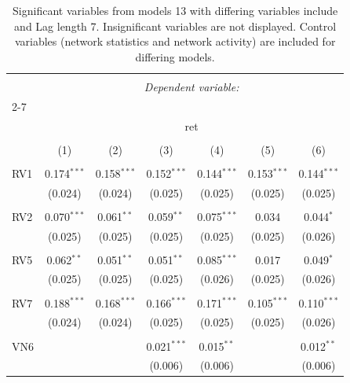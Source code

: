 
\begin{table}[!htbp] \centering 
  \caption{Significant variables from models 13 with differing variables include 
                               and Lag length 7. Insignificant variables are not displayed. 
                               Control variables (network statistics and network activity) are 
                               included for differing models.} 
  \label{RVmodels1_t} 
\scriptsize 
\begin{tabular}{@{\extracolsep{5pt}}lcccccc} 
\\[-1.8ex]\hline 
\hline \\[-1.8ex] 
 & \multicolumn{6}{c}{\textit{Dependent variable:}} \\ 
\cline{2-7} 
\\[-1.8ex] & \multicolumn{6}{c}{ret} \\ 
\\[-1.8ex] & (1) & (2) & (3) & (4) & (5) & (6)\\ 
\hline \\[-1.8ex] 
 RV1 & 0.174$^{***}$ & 0.158$^{***}$ & 0.152$^{***}$ & 0.144$^{***}$ & 0.153$^{***}$ & 0.144$^{***}$ \\ 
  & (0.024) & (0.024) & (0.025) & (0.025) & (0.025) & (0.025) \\ 
  & & & & & & \\ 
 RV2 & 0.070$^{***}$ & 0.061$^{**}$ & 0.059$^{**}$ & 0.075$^{***}$ & 0.034 & 0.044$^{*}$ \\ 
  & (0.025) & (0.025) & (0.025) & (0.025) & (0.025) & (0.026) \\ 
  & & & & & & \\ 
 RV5 & 0.062$^{**}$ & 0.051$^{**}$ & 0.051$^{**}$ & 0.085$^{***}$ & 0.017 & 0.049$^{*}$ \\ 
  & (0.025) & (0.025) & (0.025) & (0.026) & (0.025) & (0.026) \\ 
  & & & & & & \\ 
 RV7 & 0.188$^{***}$ & 0.168$^{***}$ & 0.166$^{***}$ & 0.171$^{***}$ & 0.105$^{***}$ & 0.110$^{***}$ \\ 
  & (0.024) & (0.024) & (0.025) & (0.025) & (0.025) & (0.026) \\ 
  & & & & & & \\ 
 VN6 &  &  & 0.021$^{***}$ & 0.015$^{**}$ &  & 0.012$^{**}$ \\ 
  &  &  & (0.006) & (0.006) &  & (0.006) \\ 

\end{tabular}
\end{table}
